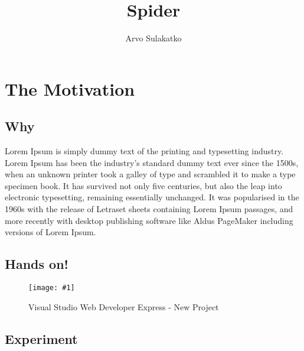 \documentclass[12pt,leqno]{book}
\title{Spider}
\author{Arvo Sulakatko}
\newcommand{\png}[1]{\texttt{[image: \#1]}}
\newcommand{\figpng}[2]{\begin{figure}[htb]\centering\png{#1}\caption{#2}\end{figure}}
\begin{document}
\maketitle

\tableofcontents
\listoffigures

\part{The Motivation}

\chapter{Why}

Lorem Ipsum is simply dummy text of the printing and typesetting industry.  Lorem Ipsum has been the industry's standard dummy text ever since the 1500s, when an unknown printer took a galley of type and scrambled it to make a type specimen book. It has survived not only five centuries, but also the leap into electronic typesetting, remaining essentially unchanged. It was popularised in the 1960s with the release of Letraset sheets containing Lorem Ipsum passages, and more recently with desktop publishing software like Aldus PageMaker including versions of Lorem Ipsum.

\chapter{Hands on!}


\figpng
{Images/New_Project-2012-03-13_09.19.10}
{Visual Studio Web Developer Express - New Project}



\chapter{Experiment}
\end{document}
